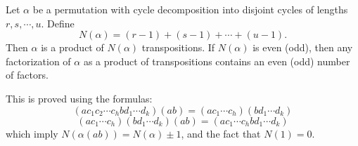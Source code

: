 Let $\alpha$ be a permutation with cycle decomposition into disjoint cycles of lengths $r, s, \cdots, u$. Define
$$N(\alpha) = (r - 1) + (s - 1) + \cdots + (u - 1).$$
Then $\alpha$ is a product of $N(\alpha)$ transpositions. If $N(\alpha)$ is even (odd), then any factorization of $\alpha$ as a product of transpositions contains an even (odd) number of factors.

This is proved using the formulas:
$$(a c_1 c_2 \cdots c_h b d_1 \cdots d_k)(ab) = (a c_1 \cdots c_h)(b d_1 \cdots d_k)$$
$$(a c_1 \cdots c_h)(b d_1 \cdots d_k)(ab) = (a c_1 \cdots c_h b d_1 \cdots d_k)$$
which imply $N(\alpha(ab)) = N(\alpha) \pm 1$, and the fact that $N(1) = 0$.
